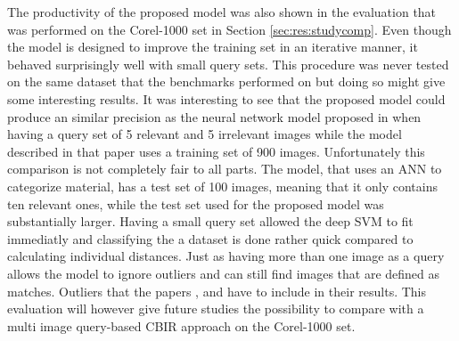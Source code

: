 The productivity of the proposed model was also shown in the evaluation that was performed on the Corel-1000 set in Section \ref{sec:res:studycomp}. Even though the model is designed to improve the training set in an iterative manner, it behaved surprisingly well with small query sets. This procedure was never tested on the same dataset that the benchmarks performed on but doing so might give some interesting results. It was interesting to see that the proposed model could produce an similar precision as the neural network model proposed in \cite{elalami2014new} when having a query set of 5 relevant and 5 irrelevant images while the model described in that paper uses a training set of 900 images. Unfortunately this comparison is not completely fair to all parts. The model, that uses an ANN to categorize material, has a test set of 100 images, meaning that it only contains ten relevant ones, while the test set used for the proposed model was substantially larger. Having a small query set allowed the deep SVM to fit immediatly and classifying the a dataset is done rather quick compared to calculating individual distances. Just as having more than one image as a query allows the model to ignore outliers and can still find images that are defined as matches. Outliers that the papers \cite{wang2001simplicity}, \cite{subrahmanyam2013modified} and \cite{nagaraja2015low} have to include in their results. This evaluation will however give future studies the possibility to compare with a multi image query-based CBIR approach on the Corel-1000 set.
